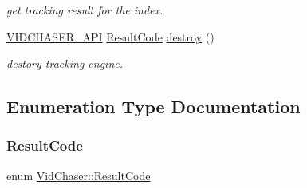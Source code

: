 \begin{DoxyCompactItemize}
\begin{DoxyCompactList}\small\item\em get tracking result for the index. \end{DoxyCompactList}\item 
\hyperlink{_vid_chaser_a_p_i_8h_abe868bb94e22f611aece5087695f9ef3}{V\+I\+D\+C\+H\+A\+S\+E\+R\+\_\+\+A\+PI} \hyperlink{namespace_vid_chaser_a9a65fd4518380d53654f1af799cbf8ed}{Result\+Code} \hyperlink{namespace_vid_chaser_a1203d8bbc0f9fd8d15c8e7ad4a39d0a1}{destroy} ()
\begin{DoxyCompactList}\small\item\em destory tracking engine. \end{DoxyCompactList}\end{DoxyCompactItemize}


\subsection{Enumeration Type Documentation}
\mbox{\label{namespace_vid_chaser_a9a65fd4518380d53654f1af799cbf8ed}} 
\subsubsection{\texorpdfstring{Result\+Code}{ResultCode}}
{\footnotesize\ttfamily enum \hyperlink{namespace_vid_chaser_a9a65fd4518380d53654f1af799cbf8ed}{Vid\+Chaser\+::\+Result\+Code}}

